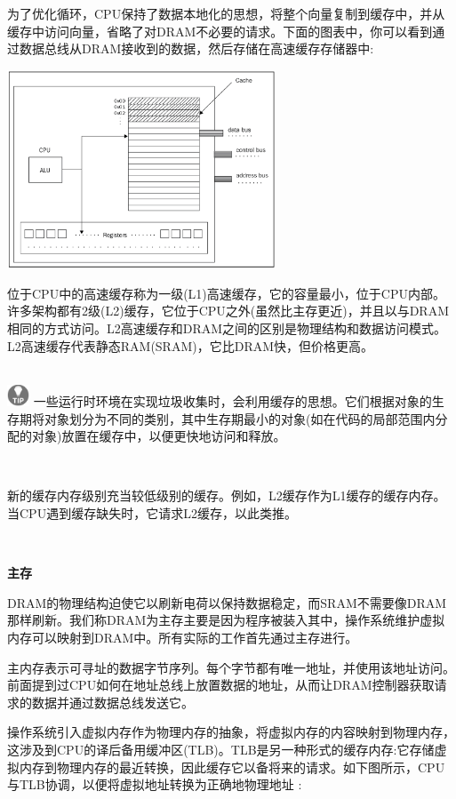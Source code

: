为了优化循环，CPU保持了数据本地化的思想，将整个向量复制到缓存中，并从缓存中访问向量，省略了对DRAM不必要的请求。下面的图表中，你可以看到通过数据总线从DRAM接收到的数据，然后存储在高速缓存存储器中:\par

\begin{center}
	\includegraphics[width=0.6\textwidth]{content/Section-1/Chapter-5/9}
\end{center}

位于CPU中的高速缓存称为一级(L1)高速缓存，它的容量最小，位于CPU内部。许多架构都有2级(L2)缓存，它位于CPU之外(虽然比主存更近)，并且以与DRAM相同的方式访问。L2高速缓存和DRAM之间的区别是物理结构和数据访问模式。L2高速缓存代表静态RAM(SRAM)，它比DRAM快，但价格更高。 \par

\hspace*{\fill} \\ %
\includegraphics[width=0.05\textwidth]{images/tip}
一些运行时环境在实现垃圾收集时，会利用缓存的思想。它们根据对象的生存期将对象划分为不同的类别，其中生存期最小的对象(如在代码的局部范围内分配的对象)放置在缓存中，以便更快地访问和释放。 \par
\noindent\textbf{}\ \par

新的缓存内存级别充当较低级别的缓存。例如，L2缓存作为L1缓存的缓存内存。当CPU遇到缓存缺失时，它请求L2缓存，以此类推。 \par

\noindent\textbf{}\ \par
\textbf{主存} \ \par
DRAM的物理结构迫使它以刷新电荷以保持数据稳定，而SRAM不需要像DRAM那样刷新。我们称DRAM为主存主要是因为程序被装入其中，操作系统维护虚拟内存可以映射到DRAM中。所有实际的工作首先通过主存进行。 \par
主内存表示可寻址的数据字节序列。每个字节都有唯一地址，并使用该地址访问。前面提到过CPU如何在地址总线上放置数据的地址，从而让DRAM控制器获取请求的数据并通过数据总线发送它。 \par
操作系统引入虚拟内存作为物理内存的抽象，将虚拟内存的内容映射到物理内存，这涉及到CPU的译后备用缓冲区(TLB)。TLB是另一种形式的缓存内存:它存储虚拟内存到物理内存的最近转换，因此缓存它以备将来的请求。如下图所示，CPU与TLB协调，以便将虚拟地址转换为正确地物理地址 :\par


